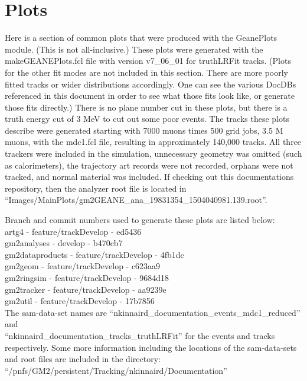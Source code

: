 \newpage
\section{Plots}
\label{sec:Plots}

Here is a section of common plots that were produced with the GeanePlots module. (This is not all-inclusive.) These plots were generated with the makeGEANEPlots.fcl file with version v7\_06\_01 for truthLRFit tracks. (Plots for the other fit modes are not included in this section. There are more poorly fitted tracks or wider distributions accordingly. One can see the various DocDBs referenced in this document in order to see what those fits look like, or generate those fits directly.) There is no plane number cut in these plots, but there is a truth energy cut of 3 MeV to cut out some poor events. The tracks these plots describe were generated starting with 7000 muons times 500 grid jobs, 3.5 M muons, with the mdc1.fcl file, resulting in approximately 140,000 tracks. All three trackers were included in the simulation, unnecessary geometry was omitted (such as calorimeters), the trajectory art records were not recorded, orphans were not tracked, and normal material was included. If checking out this documentations repository, then the analyzer root file is located in ``Images/MainPlots/gm2GEANE\_ana\_19831354\_1504040981.139.root''.

Branch and commit numbers used to generate these plots are listed below: \\

artg4 - feature/trackDevelop - ed5436 \\

gm2analyses - develop - b470cb7 \\

gm2dataproducts - feature/trackDevelop - 4fb1dc \\

gm2geom - feature/trackDevelop - c623aa9 \\

gm2ringsim - feature/trackDevelop - 9684d18 \\

gm2tracker - feature/trackDevelop - aa9239e \\

gm2util - feature/trackDevelop - 17b7856 \\

The sam-data-set names are ``nkinnaird\_documentation\_events\_mdc1\_reduced'' and \\
``nkinnaird\_documentation\_tracks\_truthLRFit'' for the events and tracks respectively.
Some more information including the locations of the sam-data-sets and root files are included in the directory: \\
``/pnfs/GM2/persistent/Tracking/nkinnaird/Documentation''

